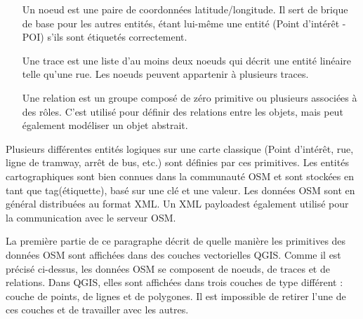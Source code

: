\begin{itemize}[label=--]
\item[Un noeud] est une paire de coordonnées latitude/longitude. Il sert de brique de base pour les autres entités, étant lui-même une entité (Point d'intérêt - POI) s'ils sont étiquetés correctement.
\item[Une trace] est une liste d'au moins deux noeuds qui décrit une entité linéaire telle qu'une rue. Les noeuds peuvent appartenir à plusieurs traces.
\item[Une relation] est un groupe composé de zéro primitive ou plusieurs associées à des rôles. C'est utilisé pour définir des relations entre les objets, mais peut également modéliser un objet abstrait.
\end{itemize}

Plusieurs différentes entités logiques sur une carte classique (Point d'intérêt, rue, ligne de tramway, arrêt de bus, etc.) sont définies par ces primitives. Les entités cartographiques sont bien connues dans la communauté OSM et sont stockées en tant que \og tag\fg (étiquette), basé sur une clé et une valeur. Les données OSM sont en général distribuées au format XML. Un \og XML payload\fg est également utilisé pour la communication avec le serveur OSM.

\label{qgis-osm-connection}

La première partie de ce paragraphe décrit de quelle manière les primitives des données OSM sont affichées dans des couches vectorielles QGIS. Comme il est précisé ci-dessus, les données OSM se composent de noeuds, de traces et de relations. Dans QGIS, elles sont affichées dans trois couches de type différent : couche de points, de lignes et de polygones. Il est impossible de retirer l'une de ces couches et de travailler avec les autres.


